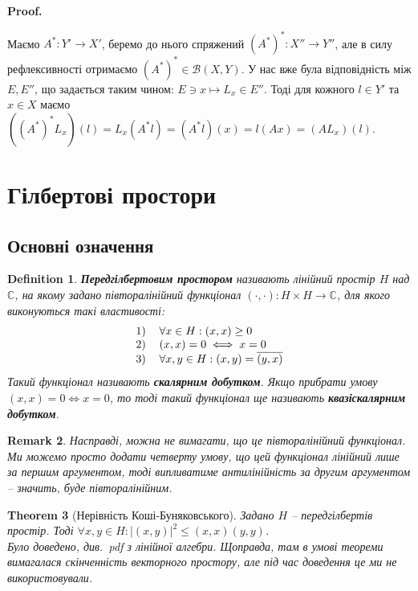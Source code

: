 \documentclass[a4paper, 10pt]{article}
\makeatletter
\theoremstyle{theoremdd}
\newtheorem{theorem}{Theorem}[subsection]
\theoremstyle{theoremdd}
\newtheorem{definition}[theorem]{Definition}
\theoremstyle{theoremdd}
\theoremstyle{theoremdd}
\theoremstyle{theoremdd}
\theoremstyle{theoremdd}
\newtheorem{remark}[theorem]{Remark}
\theoremstyle{theoremdd}
\theoremstyle{theoremdd}
\renewenvironment{proof}[1][Proof.\\]{\par
\pushQED{\hfill \qed}%
\normalfont \topsep6\p@\@plus6\p@\relax
\trivlist
\item\relax
{\bfseries
#1\@addpunct{.}}\hspace\labelsep\ignorespaces
}{%
\popQED\endtrivlist\@endpefalse
}
\makeatother
\begin{document}
\begin{proof}
Маємо $A^* \colon Y' \to X'$, беремо до нього спряжений $(A^*)^* \colon X'' \to Y''$, але в силу рефлексивності отримаємо $(A^*)^* \in \mathcal{B}(X,Y)$. У нас вже була відповідність між $E,E''$, що задається таким чином: $E \ni x \mapsto L_x \in E''$. Тоді для кожного $l \in Y'$ та $x \in X$ маємо\\
$((A^*)^*L_x)(l) = L_x(A^*l) = (A^*l)(x) = l(Ax) = (AL_x)(l)$.
\end{proof}
\newpage

\section{Гілбертові простори}
\subsection{Основні означення}
\begin{definition}
\textbf{Передгілбертовим простором} називають лінійний простір $H$ над $\mathbb{C}$, на якому задано півторалінійний функціонал $(\cdot, \cdot) \colon H \times H \to \mathbb{C}$, для якого виконуються такі властивості:
\begin{align*}
\begin{tabular}{cl}
1) & $\forall x \in H: (x, x) \geq 0$\\
2) & $(x, x) = 0 \iff x = 0$\\
3) & $\forall x,y \in H: (x, y) = \overline{(y, x)}$
\end{tabular}
\end{align*}
Такий функціонал називають \textbf{скалярним добутком}. Якщо прибрати умову $(x,x) = 0 \iff x = 0$, то тоді такий функціонал ще називають \textbf{квазіскалярним добутком}.
\end{definition}

\begin{remark}
Насправді, можна не вимагати, що це півторалінійний функціонал. Ми можемо просто додати четверту умову, що цей функціонал лінійний лише за першим аргументом, тоді випливатиме антилінійність за другим аргументом -- значить, буде півторалінійним.
\end{remark}

\begin{theorem}[Нерівність Коші-Буняковського]
Задано $H$ -- передгілбертів простір. Тоді $\forall x,y \in H: |(x,y)|^2 \leq (x,x)(y,y)$.\\
\textit{Було доведено, див.\ pdf з лінійної алгебри. Щоправда, там в умові теореми вимагалася скінченність векторного простору, але під час доведення це ми не використовували.}
\end{theorem}
\end{document}
